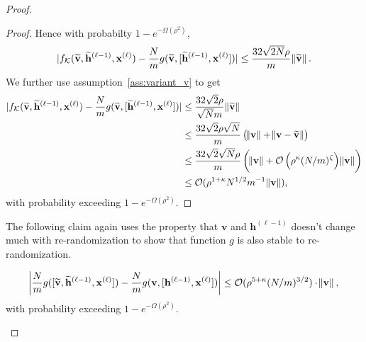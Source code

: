 \begin{proof}
\begin{proof}
		Hence with probabilty $1-e^{-\Omega(\rho^2)}$,
		\begin{equation*}
			\abs[0]{f_{\mathcal{K}}(\widetilde{\mathbf{v}}, \widetilde{\mathbf{h}}^{(\ell-1)}, \mathbf{x}^{(\ell)}) - \frac{N}{m}g(\widetilde{\mathbf{v}}, [\widetilde{\mathbf{h}}^{(\ell-1)}, \mathbf{x}^{(\ell)}])} \le \frac{32\sqrt{2N} \rho}{ m} \norm{\widetilde{\mathbf{v}}}.
		\end{equation*}
		We further use assumption~\ref{ass:variant_v} to get
		\begingroup \allowdisplaybreaks
		\begin{align*}
			\abs[0]{f_{\mathcal{K}}(\widetilde{\mathbf{v}}, \widetilde{\mathbf{h}}^{(\ell-1)}, \mathbf{x}^{(\ell)}) - \frac{N}{m}g(\widetilde{\mathbf{v}}, [\widetilde{\mathbf{h}}^{(\ell-1)}, \mathbf{x}^{(\ell)}])} &\le \frac{32\sqrt{2} \rho}{ \sqrt{N} m} \norm{\widetilde{\mathbf{v}}} \\&
			\le \frac{32\sqrt{2} \rho \sqrt{N}}{  m} \left(\norm{\mathbf{v}} + \norm{\mathbf{v} - \widetilde{\mathbf{v}}} \right)\\&
			\le \frac{32\sqrt{2} \sqrt{N}\rho}{  m} \left(\norm{\mathbf{v}} + \mathcal{O}\left(\rho^{\kappa} (N/m)^{\zeta}\right)\norm{\mathbf{v}}\right) \\&\le \mathcal{O}( \rho^{1+\kappa} N^{1/2} m^{-1} \norm{\mathbf{v}}),
		\end{align*}
		\endgroup
		with probability exceeding $1 - e^{-\Omega(\rho^2)}$.
	\end{proof}
	
	
	The following claim again uses the property that $\mathbf{v}$ and $\mathbf{h}^{(\ell - 1)}$ doesn't change much with re-randomization to show that function $g$ is also stable to re-randomization.
	\begin{claim}\label{claim:gg}
		\begin{equation*}
			\abs{\frac{N}{m}g([\widetilde{\mathbf{v}}, \widetilde{\mathbf{h}}^{(\ell-1)},  \mathbf{x}^{(\ell)}]) - \frac{N}{m}g(\mathbf{v}, [\mathbf{h}^{(\ell-1)},  \mathbf{x}^{(\ell)}])} \le \mathcal{O}(\rho^{5 + \kappa} (N/m)^{3/2}) \cdot \norm{\mathbf{v}},
		\end{equation*}
		with probability exceeding $1 - e^{-\Omega(\rho^2)}$.
	\end{claim}
	

\end{proof}
